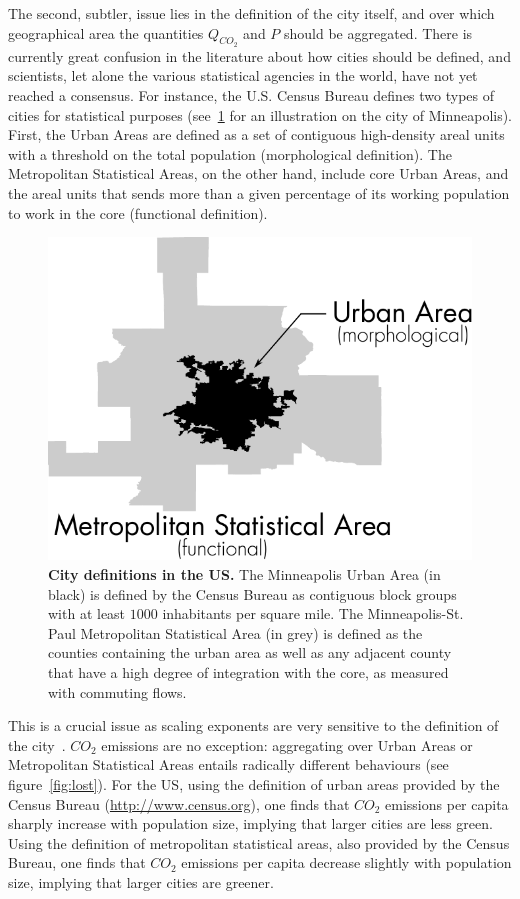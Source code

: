 The second, subtler, issue lies in the definition of the city itself, and over
which geographical area the quantities $Q_{CO_2}$ and $P$ should be aggregated.
There is currently great confusion in the literature about how cities should be
defined, and scientists, let alone the various statistical agencies in the
world, have not yet reached a consensus. For instance, the U.S. Census Bureau
defines two types of cities for statistical purposes
(see~\ref{fig:two_definitions} for an illustration on the city of Minneapolis).
First, the Urban Areas are defined as a set of contiguous high-density areal
units with a threshold on the total population (morphological definition). The Metropolitan Statistical
Areas, on the other hand, include core Urban Areas, and the areal units that
sends more than a given percentage of its working population to work in the
core (functional definition).

\begin{figure}
    \centering
    \includegraphics[width=\textwidth]{gfx/chapter-scaling/city_definition.pdf}
    \caption{{\bf City definitions in the US.} The Minneapolis Urban Area (in
    black) is defined by the Census Bureau as contiguous block groups with at
least $1000$ inhabitants per square mile. The Minneapolis-St. Paul Metropolitan
Statistical Area (in grey) is defined as the counties containing the urban area
as well as any adjacent county that have a high degree of integration with the
core, as measured with commuting flows.\label{fig:two_definitions}}
\end{figure}


This is a crucial issue as scaling exponents are very sensitive to the
definition of the city~\cite{Arcaute:2013}.  $CO_2$ emissions are no exception:
aggregating over Urban Areas or Metropolitan Statistical Areas entails radically
different behaviours (see figure~\ref{fig:lost}). For the US, using the
definition of urban areas provided by the Census Bureau
(\url{http://www.census.org}), one finds that $CO_2$ emissions per capita
sharply increase with population size, implying that larger cities are less
green. Using the definition of metropolitan statistical areas, also provided by
the Census Bureau, one finds that $CO_2$ emissions per capita decrease slightly
with population size, implying that larger cities are greener.\\

